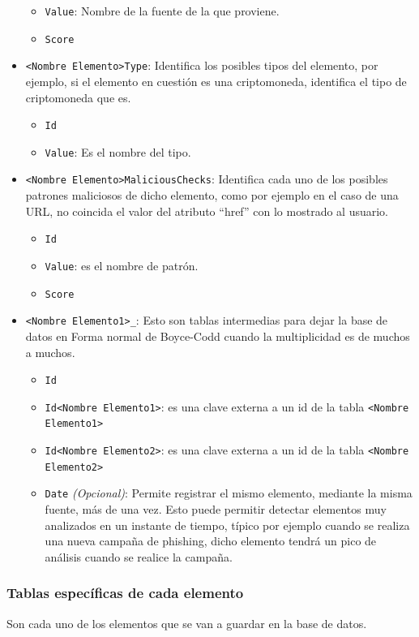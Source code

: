 \begin{itemize}
\begin{itemize}
        \item \texttt{Value}: Nombre de la fuente de la que proviene.
        \item \texttt{Score} 
    \end{itemize}
    \item \texttt{<Nombre Elemento>Type}: Identifica los posibles tipos del elemento, por ejemplo, si el elemento en cuestión es una criptomoneda, identifica el tipo de criptomoneda que es. 
    \begin{itemize}
        \item \texttt{Id}
        \item \texttt{Value}: Es el nombre del tipo.
    \end{itemize}
    \item \texttt{<Nombre Elemento>MaliciousChecks}: Identifica cada uno de los posibles patrones maliciosos de dicho elemento, como por ejemplo en el caso de una URL, no coincida el valor del atributo “href” con lo mostrado al usuario.
    \begin{itemize}
        \item \texttt{Id}
        \item \texttt{Value}: es el nombre de patrón.
        \item \texttt{Score}
    \end{itemize}
    \item \texttt{<Nombre Elemento1>\_<Nombre Elemento2>}: Esto son tablas intermedias para dejar la base de datos en Forma normal de Boyce-Codd cuando la multiplicidad es de muchos a muchos.
    \begin{itemize}
        \item \texttt{Id}
        \item \texttt{Id<Nombre Elemento1>}: es una clave externa a un id de la tabla \texttt{<Nombre Elemento1>}
        \item \texttt{Id<Nombre Elemento2>}: es una clave externa a un id de la tabla \texttt{<Nombre Elemento2>}
        \item \texttt{Date} \emph{(Opcional)}: Permite registrar el mismo elemento, mediante la misma fuente, más de una vez. Esto puede permitir detectar elementos muy analizados en un instante de tiempo, típico por ejemplo cuando se realiza una nueva campaña de phishing, dicho elemento tendrá un pico de análisis cuando se realice la campaña.
    \end{itemize}
\end{itemize}

\subsubsection{Tablas específicas de cada elemento}
Son cada uno de los elementos que se van a guardar en la base de datos.

